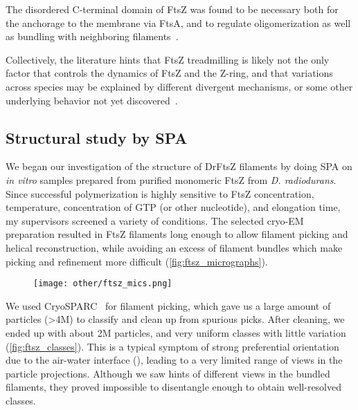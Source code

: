 The disordered C-terminal domain of FtsZ was found to be necessary both for the anchorage to the membrane via FtsA, and to regulate oligomerization as well as bundling with neighboring filaments~\cite{barrowsFtsZDynamicsBacterial2021}.

Collectively, the literature hints that FtsZ treadmilling is likely not the only factor that controls the dynamics of FtsZ and the Z-ring, and that variations across species may be explained by different divergent mechanisms, or some other underlying behavior not yet discovered~\cite{barrowsFtsZDynamicsBacterial2021}.

\subsection{Structural study by SPA}

We began our investigation of the structure of DrFtsZ filaments by doing SPA on \textit{in vitro} samples prepared from purified monomeric FtsZ from \textit{D. radiodurans}.
Since successful polymerization is highly sensitive to FtsZ concentration, temperature, concentration of GTP (or other nucleotide), and elongation time, my supervisors screened a variety of conditions.
The selected cryo-EM preparation resulted in FtsZ filaments long enough to allow filament picking and helical reconstruction, while avoiding an excess of filament bundles which make picking and refinement more difficult (\autoref{fig:ftsz_micrographs}).

\begin{figure}[ht]
    \centering
    \texttt{[image: other/ftsz\_mics.png]}
    \label{fig:ftsz_micrographs}
\end{figure}

We used CryoSPARC~\cite{punjaniCryoSPARCAlgorithmsRapid2017} for filament picking, which gave us a large amount of particles (>4M) to classify and clean up from spurious picks.
After cleaning, we ended up with about 2M particles, and very uniform classes with little variation (\autoref{fig:ftsz_classes}).
This is a typical symptom of strong preferential orientation due to the air-water interface (), leading to a very limited range of views in the particle projections.
Although we saw hints of different views in the bundled filaments, they proved impossible to disentangle enough to obtain well-resolved classes.

